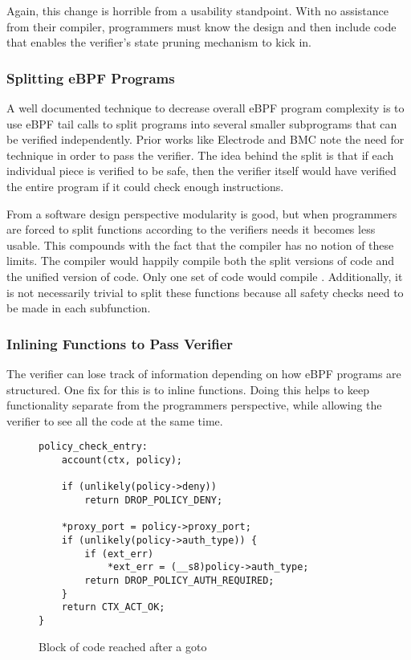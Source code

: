 Again, this change is horrible from a usability standpoint.
With no assistance from their compiler, programmers must know the design and then include code that enables the verifier's state pruning mechanism to kick in.

\subsubsection{Splitting eBPF Programs}
A well documented technique to decrease overall eBPF program complexity is to use eBPF tail calls to split programs into several smaller subprograms that can be verified independently.
Prior works like Electrode and BMC note the need for technique in order to pass the verifier.
The idea behind the split is that if each individual piece is verified to be safe, then the verifier itself would have verified the entire program if it could check enough instructions.

From a software design perspective modularity is good, but when programmers are forced to split functions according to the verifiers needs it becomes less usable.
This compounds with the fact that the compiler has no notion of these limits.
The compiler would happily compile both the split versions of code and the unified version of code.
Only one set of code would compile .
Additionally, it is not necessarily trivial to split these functions because all safety checks need to be made in each subfunction.

\subsubsection{Inlining Functions to Pass Verifier}
The verifier can lose track of information depending on how eBPF programs are structured.
One fix for this is to inline functions.
Doing this helps to keep functionality separate from the programmers perspective, while allowing the verifier to see all the code at the same time.

\begin{figure}
    \begin{lstlisting}[language=myC]
policy_check_entry:
	account(ctx, policy);

	if (unlikely(policy->deny))
		return DROP_POLICY_DENY;

	*proxy_port = policy->proxy_port;
	if (unlikely(policy->auth_type)) {
		if (ext_err)
			*ext_err = (__s8)policy->auth_type;
		return DROP_POLICY_AUTH_REQUIRED;
	}
	return CTX_ACT_OK;
}
    \end{lstlisting}
    \caption{Block of code reached after a goto}
    \label{fig:inline-fig}
\end{figure}


